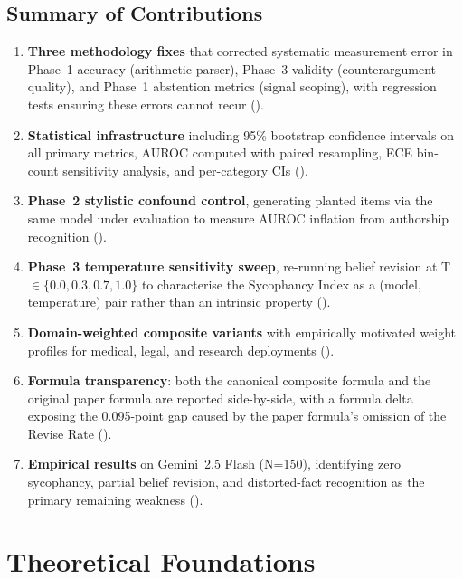\documentclass[12pt,a4paper]{article}
\begin{document}
\subsection{Summary of Contributions}

\begin{enumerate}[leftmargin=2em]
    \item \textbf{Three methodology fixes} that corrected systematic measurement error in
          Phase~1 accuracy (arithmetic parser), Phase~3 validity (counterargument quality),
          and Phase~1 abstention metrics (signal scoping), with regression tests ensuring
          these errors cannot recur ().
    \item \textbf{Statistical infrastructure} including 95\% bootstrap confidence intervals
          on all primary metrics, AUROC computed with paired resampling, ECE bin-count
          sensitivity analysis, and per-category CIs ().
    \item \textbf{Phase~2 stylistic confound control}, generating planted items via the
          same model under evaluation to measure AUROC inflation from authorship recognition
          ().
    \item \textbf{Phase~3 temperature sensitivity sweep}, re-running belief revision at
          T~$\in \{0.0, 0.3, 0.7, 1.0\}$ to characterise the Sycophancy Index as a
          (model, temperature) pair rather than an intrinsic property ().
    \item \textbf{Domain-weighted composite variants} with empirically motivated weight
          profiles for medical, legal, and research deployments ().
    \item \textbf{Formula transparency}: both the canonical composite formula and the
          original paper formula are reported side-by-side, with a formula delta exposing
          the 0.095-point gap caused by the paper formula's omission of the Revise Rate
          ().
    \item \textbf{Empirical results} on Gemini~2.5 Flash (N=150), identifying zero
          sycophancy, partial belief revision, and distorted-fact recognition as the
          primary remaining weakness ().
\end{enumerate}

\section{Theoretical Foundations}
\label{sec:theory}
\end{document}
